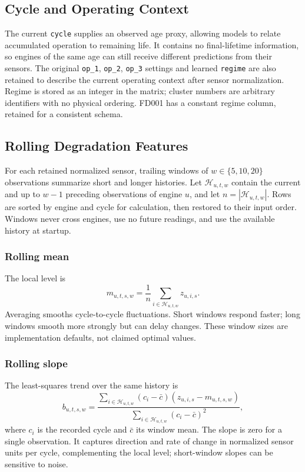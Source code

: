 \subsection{Cycle and Operating Context}
The current \texttt{cycle} supplies an observed age proxy, allowing models to
relate accumulated operation to remaining life. It contains no final-lifetime
information, so engines of the same age can still receive different predictions
from their sensors. The original \texttt{op\_1}, \texttt{op\_2},
\texttt{op\_3} settings and learned \texttt{regime} are also retained to describe
the current operating context after sensor normalization. Regime is stored as
an integer in the matrix; cluster numbers are arbitrary identifiers with no
physical ordering. FD001 has a constant regime column, retained for a
consistent schema.

\subsection{Rolling Degradation Features}
For each retained normalized sensor, trailing windows of $w\in\{5,10,20\}$
observations summarize short and longer histories. Let $\mathcal{H}_{u,t,w}$
contain the current and up to $w-1$ preceding observations of engine $u$, and
let $n=|\mathcal{H}_{u,t,w}|$. Rows are sorted by engine and cycle for
calculation, then restored to their input order. Windows never cross engines,
use no future readings, and use the available history at startup.

\subsubsection{Rolling mean}
The local level is
\begin{equation}
    m_{u,t,s,w}=\frac{1}{n}\sum_{i\in\mathcal{H}_{u,t,w}}z_{u,i,s}.
\end{equation}
Averaging smooths cycle-to-cycle fluctuations. Short windows respond faster;
long windows smooth more strongly but can delay changes. These window sizes
are implementation defaults, not claimed optimal values.

\subsubsection{Rolling slope}
The least-squares trend over the same history is
\begin{equation}
    b_{u,t,s,w}=
    \frac{\sum_{i\in\mathcal{H}_{u,t,w}}(c_i-\bar{c})(z_{u,i,s}-m_{u,t,s,w})}
         {\sum_{i\in\mathcal{H}_{u,t,w}}(c_i-\bar{c})^2},
\end{equation}
where $c_i$ is the recorded cycle and $\bar{c}$ its window mean. The slope is
zero for a single observation. It captures direction and rate of change in
normalized sensor units per cycle, complementing the local level; short-window
slopes can be sensitive to noise.

